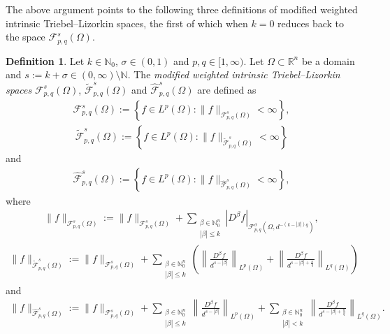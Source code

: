 \documentclass[11pt,twoside]{article}
\def\rn{{\mathbb{R}^n}}
\def\nn{{\mathbb N}}
\def\nno{\nn_0}
\def\cf{{\mathcal F}}
\def\hf{{\mathscr F }}
\def\bz{\beta}
\def\boz{{\Omega}}
\def\sz{\sigma}
\theoremstyle{mylem}
\theoremstyle{definition}
\newtheorem{definition}[theorem]{Definition}
\numberwithin{equation}{section}
\begin{document}
The above argument points to the following three definitions of modified weighted intrinsic Triebel--Lizorkin spaces,
the first of which when $k=0$ reduces back to the space $\mathcal F_{p,q}^s(\Omega)$.

\begin{definition}\label{def-secmain}
Let \( k \in \nn_0 \), \(\sz\in(0,1) \) and \( p, q\in[1, \infty) \). Let \( \boz \subset \rn\) be a domain and
$s := k + \sz\in (0,\infty)\setminus \nn$. The \emph{modified weighted intrinsic Triebel--Lizorkin spaces}
$\hf_{p,q}^{s}(\boz)$,
$\widetilde{\mathscr{F}}_{p,q}^{s}(\boz)$ 
and $\widehat{\mathscr{F}}_{p,q}^{s}(\boz)$
are defined as
\begin{align*}
\hf_{p,q}^{s}(\boz):=\left\{ f \in L^p(\boz) : \| f \|_{\hf_{p,q}^{s}(\boz)} < \infty \right\},
\end{align*}
\begin{align*}
\widetilde{\mathscr{F}}_{p,q}^{s}(\boz) := \left\{ f \in L^p(\boz) : \| f \|_{\widetilde{\mathscr{F}}_{p,q}^{s}(\boz)} < \infty \right\}
\end{align*}
and
\begin{align*}
\widehat{\mathscr{F}}_{p,q}^{s}(\boz):= \left\{ f \in L^p(\boz) : \| f \|_{\widehat{\mathscr{F}}_{p,q}^{s}(\boz)} < \infty \right\},
\end{align*}
where
\begin{align}\label{eqn-GWN}
\| f \|_{\hf_{p,q}^{s}(\boz)}
:=\| f \|_{\cf_{p,q}^{s}(\boz)} + \sum_{\substack{\bz\in\nno^n \\ | \bz |\leq k}} 
\left|D^{\bz}f\right|_{\cf_{p,q}^{\sz}(\boz,d^{-(k-|\bz|)q})},
\end{align}
\begin{align*}
\| f \|_{\widetilde{\mathscr{F}}_{p,q}^{s}(\boz)}
:=\| f \|_{\hf_{p,q}^{s}(\boz)}+ \sum_{\substack{\bz\in\nno^n \\ |\bz| \leq k}}
\left(\left\|\frac{D^\beta f}{d^{s-|\beta|}}\right\|_{L^p(\Omega)}+\left\|\frac{D^\beta f}{d^{s-|\beta|+\frac{n}{q}}}\right\|_{L^q(\Omega)}\right)
\end{align*}
and
\begin{align*}
\| f \|_{\widehat{\mathscr{F}}_{p,q}^{s}(\boz)}
:=\| f \|_{\hf_{p,q}^{s}(\boz)}+\sum_{\substack{\bz\in\nno^n \\ |\bz| \leq k}}
\left\|\frac{D^\beta f}{d^{s-|\beta|}}\right\|_{L^p(\Omega)}+\sum_{\substack{\bz\in\nno^n \\|\bz| < k}} \left\|\frac{D^\beta f}{d^{s-|\beta|+\frac{n}{q}}}\right\|_{L^q(\Omega)}.
\end{align*}
\end{definition}
\end{document}
